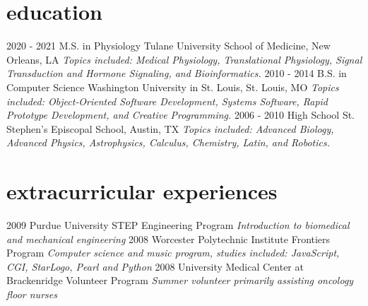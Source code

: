 \documentclass[]{cv}
\begin{document}
\section{education}

\begin{entrylist}
  \entry
    {2020 - 2021}
    {M.S. in Physiology}
    {Tulane University School of Medicine, New Orleans, LA}
    {\emph{Topics included: Medical Physiology, Translational Physiology, Signal Transduction and Hormone Signaling, and Bioinformatics.}}
  \entry
    {2010 - 2014}
    {B.S. in Computer Science}
    {Washington University in St. Louis, St. Louis, MO}
    {\emph{Topics included: Object‐Oriented Software Development, Systems Software, Rapid Prototype Development, and Creative Programming.}}
  \entry
    {2006 - 2010}
    {High School}
    {St. Stephen’s Episcopal School, Austin, TX}
    {\emph{Topics included: Advanced Biology, Advanced Physics, Astrophysics, Calculus, Chemistry, Latin, and Robotics.}}
\end{entrylist}

\section{extracurricular experiences}

\begin{entrylist}
  \entry
    {2009}
    {Purdue University STEP Engineering Program}{}
    {\emph{Introduction to biomedical and mechanical engineering}}
  \entry
    {2008}
    {Worcester Polytechnic Institute Frontiers Program}{}
    {\emph{Computer science and music program, studies included: JavaScript, CGI, StarLogo, Pearl and Python}}
  \entry
    {2008}
    {University Medical Center at Brackenridge Volunteer Program}{}
    {\emph{Summer volunteer primarily assisting oncology floor nurses}}
\end{entrylist}
\end{document}
